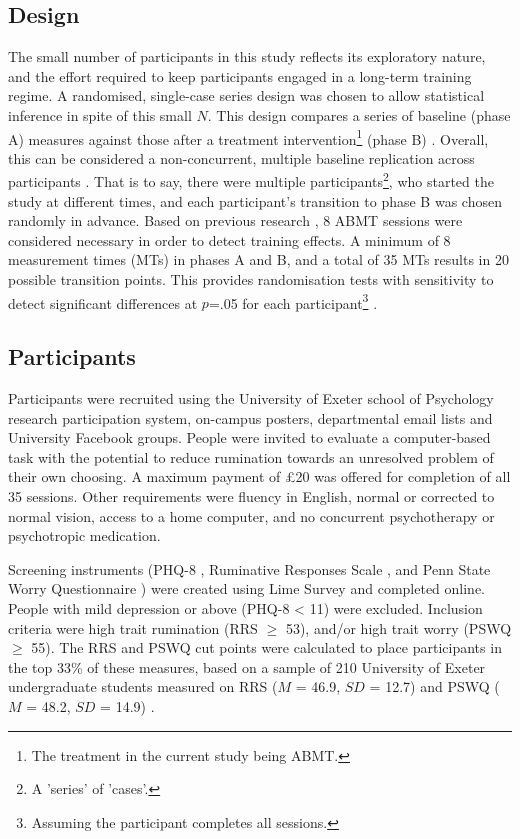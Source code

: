 \documentclass[man,floatsintext,a4paper,biblatex]{apa6}\usepackage[]{graphicx}\usepackage[]{color}
\begin{document}
\subsection{Design}

The small number of participants in this study reflects its exploratory
nature, and the effort required to keep participants engaged in
a long-term training regime. A randomised, single-case series
design \parencite{bulte_r_2008} was chosen to allow statistical
inference in spite of this small ${N}$.  This design compares a
series of baseline (phase A) measures against those after a treatment
intervention\footnote{The treatment in the current study being ABMT.}
(phase B) \parencite{bulte_r_2008}. Overall, this can be considered
a non-concurrent, multiple baseline replication across participants
\parencite{watson_nonconcurrent_1981}. That is to say, there were
multiple participants\footnote{A 'series' of 'cases'.}, who started
the study at different times, and each participant's transition to
phase B was chosen randomly in advance. Based on previous research
\parencite{yang_attention_2015}, 8 ABMT sessions were considered
necessary in order to detect training effects. A minimum of 8 measurement
times (MTs) in phases A and B, and a total of 35 MTs results in 20
possible transition points. This provides randomisation tests with
sensitivity to detect significant differences at ${p}$=.05 for each
participant\footnote{Assuming the participant completes all sessions.}
\parencite{onghena_customization_2005,bulte_r_2008}.

\subsection{Participants}

Participants were recruited  using the University of Exeter school of
Psychology research participation system, on-campus posters, departmental
email lists and University Facebook groups. People were invited to
evaluate a computer-based task with the potential to reduce rumination
towards an unresolved problem of their own choosing.  A maximum payment
of {\pounds}20 was offered for completion of all 35 sessions. Other
requirements were fluency in English, normal or corrected to normal
vision, access to a home computer, and no concurrent psychotherapy or
psychotropic medication.

Screening instruments (PHQ-8 \parencite{kroenke_phq8_2009}, Ruminative
Responses Scale \parencite[RRS; ][]{treynor_rumination_2003}, and Penn
State Worry Questionnaire \parencite[PSWQ; ][]{meyer_development_1990})
were created using Lime Survey \parencite{limesurvey} and completed
online. People with mild depression or above (PHQ-8 {\textless} 11) were
excluded. Inclusion criteria were high trait rumination (RRS ${\geq}$
53), and/or high trait worry (PSWQ ${\geq}$ 55). The RRS and PSWQ cut
points were calculated to place participants in the top 33\% of these
measures, based on a sample of 210 University of Exeter undergraduate
students measured on RRS (${M}$ = 46.9, ${SD}$ = 12.7) and PSWQ (${M}$
= 48.2, ${SD}$ = 14.9) \parencite{moberly_controlled_2015}.
\end{document}
